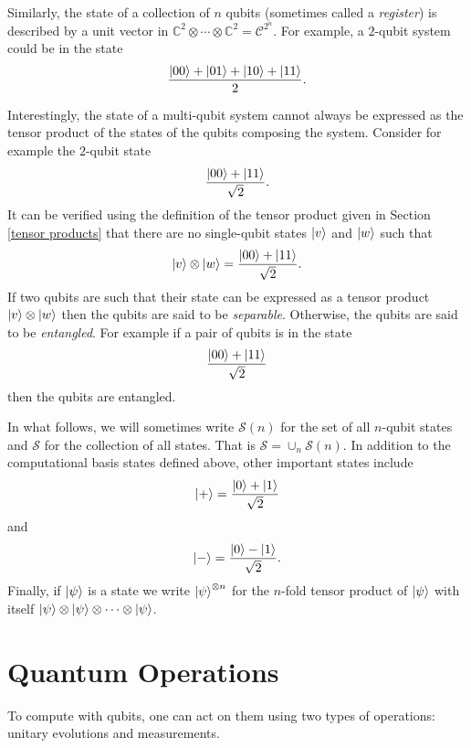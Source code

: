 \documentclass[12pt]{dalthesis}
\begin{document}
Similarly, the state of a collection of $n$ qubits (sometimes called a \emph{register}) is described by a unit vector in $\mathbb{C}^2 \otimes \cdots \otimes \mathbb{C}^2 = \mathcal{C}^{2^n}$. For example, a $2$-qubit system could be in the state \[ \frac{\ket{00} + \ket{01} + \ket{10} + \ket{11}}{2}. \]

Interestingly, the state of a multi-qubit system cannot always be expressed as the tensor product of the states of the qubits composing the system. Consider for example the $2$-qubit state \[ \frac{\ket{00} + \ket{11}}{\sqrt{2}}. \]
It can be verified using the definition of the tensor product given in Section \ref{tensor products} that there are no single-qubit states $\ket{v}$ and $\ket{w}$ such that \[ \ket{v} \otimes \ket{w} = \frac{\ket{00} + \ket{11}}{\sqrt{2}}. \]
If two qubits are such that their state can be expressed as a tensor product $\ket{v} \otimes \ket{w}$ then the qubits are said to be \emph{separable}. Otherwise, the qubits are said to be \emph{entangled}.
For example if a pair of qubits is in the state \[ \frac{\ket{00} + \ket{11}}{\sqrt{2}} \] then the qubits are entangled.

In what follows, we will sometimes write $\mathcal{S}(n)$ for the set of all $n$-qubit states and $\mathcal{S}$ for the collection of all states. That is $\mathcal{S} = \cup_n \mathcal{S}(n)$. In addition to the computational basis states defined above, other important states include \[ \ket{+} = \frac{\ket{0} + \ket{1}}{\sqrt{2}} \] and \[ \ket{-} = \frac{\ket{0} - \ket{1}}{\sqrt{2}}. \]
Finally, if $\ket{\psi}$ is a state we write $\ket{\psi}^{\otimes n}$ for the $n$-fold tensor product of $\ket{\psi}$ with itself $\ket{\psi} \otimes \ket{\psi} \otimes \cdots \otimes \ket{\psi}$.

\section{Quantum Operations}
To compute with qubits, one can act on them using two types of operations: unitary evolutions and measurements.
\end{document}
